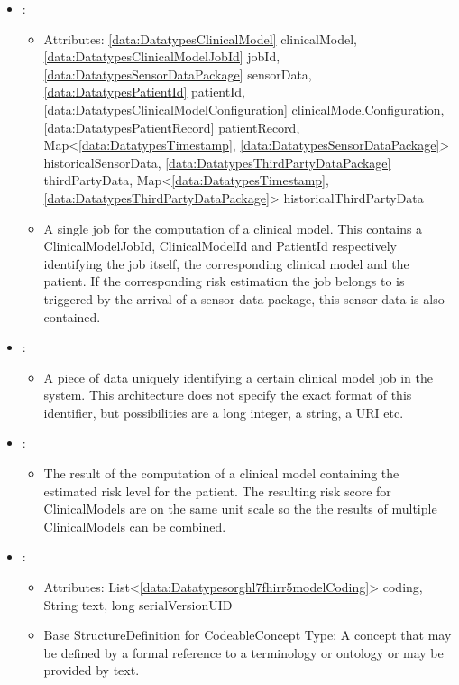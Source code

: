 \begin{itemize}[nolistsep,noitemsep]
\item {}: 
\begin{itemize}[noitemsep,nolistsep]
\item[] Attributes: \ref{data:DatatypesClinicalModel} clinicalModel, \ref{data:DatatypesClinicalModelJobId} jobId, \ref{data:DatatypesSensorDataPackage} sensorData, \ref{data:DatatypesPatientId} patientId, \ref{data:DatatypesClinicalModelConfiguration} clinicalModelConfiguration, \ref{data:DatatypesPatientRecord} patientRecord, Map\textless{}\ref{data:DatatypesTimestamp}, \ref{data:DatatypesSensorDataPackage}\textgreater{} historicalSensorData, \ref{data:DatatypesThirdPartyDataPackage} thirdPartyData, Map\textless{}\ref{data:DatatypesTimestamp}, \ref{data:DatatypesThirdPartyDataPackage}\textgreater{} historicalThirdPartyData
\item[] A single job for the computation of a clinical model. This contains a ClinicalModelJobId, ClinicalModelId and PatientId respectively identifying the job itself, the corresponding clinical model and the patient. If the corresponding risk estimation the job belongs to is triggered by the arrival of a sensor data package, this sensor data is also contained.
\end{itemize}

\item {}: 
\begin{itemize}[noitemsep,nolistsep]

\item[]  A piece of data uniquely identifying a certain clinical model job in the system. This architecture does not specify the exact format of this identifier,
but possibilities are a long integer, a string, a URI etc.
\end{itemize}

\item {}: 
\begin{itemize}[noitemsep,nolistsep]

\item[] The result of the computation of a clinical model containing the estimated
risk level for the patient.
The resulting risk score for ClinicalModels are on the same unit scale so the the results of multiple ClinicalModels can be combined.
\end{itemize}

\item {}: 
\begin{itemize}[noitemsep,nolistsep]
\item[] Attributes: List\textless{}\ref{data:Datatypesorghl7fhirr5modelCoding}\textgreater{} coding, String text, long serialVersionUID
\item[] Base StructureDefinition for CodeableConcept Type: A concept that may be defined by a formal reference to a terminology or ontology or may be provided by text.
\end{itemize}


\end{itemize}
